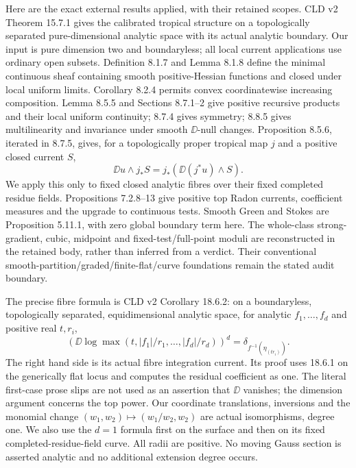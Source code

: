 Here are the exact external results applied, with their retained scopes.
CLD v2 Theorem 15.7.1 gives the calibrated tropical structure on a
topologically separated pure-dimensional analytic space with its actual
analytic boundary. Our input is pure dimension two and boundaryless; all
local current applications use ordinary open subsets. Definition 8.1.7
and Lemma 8.1.8 define the minimal continuous sheaf containing smooth
positive-Hessian functions and closed under local uniform limits.
Corollary 8.2.4 permits convex coordinatewise increasing composition.
Lemma 8.5.5 and Sections 8.7.1--2 give positive recursive products and
their local uniform continuity; 8.7.4 gives symmetry; 8.8.5 gives
multilinearity and invariance under smooth $\DD$-null changes. Proposition
8.5.6, iterated in 8.7.5, gives, for a topologically proper tropical map $j$
and a positive closed current $S$,
\[
 \DD u\wedge j_*S=j_*(\DD(j^*u)\wedge S).
\]
We apply this only to fixed closed analytic fibres over their fixed completed
residue fields. Propositions 7.2.8--13 give positive top Radon currents,
coefficient measures and the upgrade to continuous tests. Smooth Green and
Stokes are Proposition 5.11.1, with zero global boundary term here.
The whole-class strong-gradient, cubic, midpoint and fixed-test/full-point
moduli are reconstructed in the retained body, rather than inferred from a
verdict. Their conventional smooth-partition/graded/finite-flat/curve
foundations remain the stated audit boundary.

The precise fibre formula is CLD v2 Corollary 18.6.2: on a boundaryless,
topologically separated, equidimensional analytic space, for analytic
$f_1,\ldots,f_d$ and positive real $t,r_i$,
\[
 (\DD\log\max(t,|f_1|/r_1,\ldots,|f_d|/r_d))^d
 =\delta_{f^{-1}(\eta_{(tr_i)})}.
\]
The right hand side is its actual fibre integration current. Its proof uses
18.6.1 on the generically flat locus and computes the residual coefficient
as one. The literal first-case prose slips are not used as an assertion
that $\DD$ vanishes; the dimension argument concerns the top power.
Our coordinate translations, inversions and the monomial change
$(w_1,w_2)\mapsto(w_1/w_2,w_2)$ are actual isomorphisms, degree one.
We also use the $d=1$ formula first on the surface and then on its fixed
completed-residue-field curve. All radii are positive. No moving Gauss
section is asserted analytic and no additional extension degree occurs.

